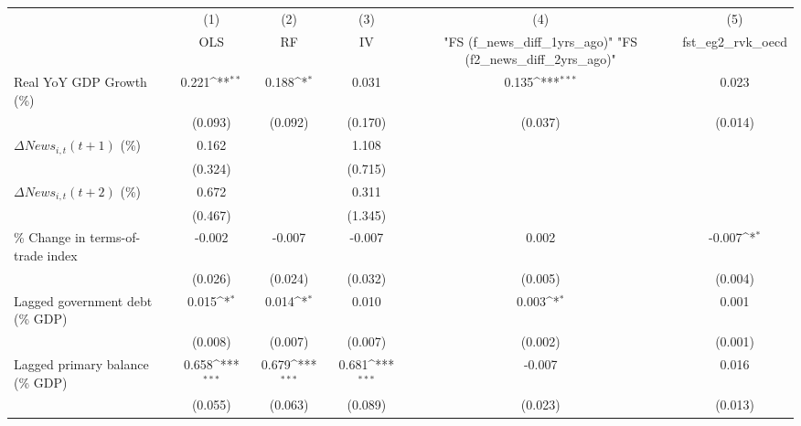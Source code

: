 {
\def\sym#1{\ifmmode^{#1}\else\(^{#1}\)\fi}
\begin{tabular}{l*{5}{c}}
\toprule
                    &\multicolumn{1}{c}{(1)}&\multicolumn{1}{c}{(2)}&\multicolumn{1}{c}{(3)}&\multicolumn{1}{c}{(4)}&\multicolumn{1}{c}{(5)}\\
                    &\multicolumn{1}{c}{OLS}&\multicolumn{1}{c}{RF}&\multicolumn{1}{c}{IV}&\multicolumn{1}{c}{ "FS (f_news_diff_1yrs_ago)"  "FS (f2_news_diff_2yrs_ago)" }&\multicolumn{1}{c}{fst_eg2_rvk_oecd}\\
\midrule
Real YoY GDP Growth (\%)&       0.221\sym{**} &       0.188\sym{*}  &       0.031         &       0.135\sym{***}&       0.023         \\
                    &     (0.093)         &     (0.092)         &     (0.170)         &     (0.037)         &     (0.014)         \\
\addlinespace
$ \Delta News_{i,t}(t+1)$ (\%)&       0.162         &                     &       1.108         &                     &                     \\
                    &     (0.324)         &                     &     (0.715)         &                     &                     \\
\addlinespace
$ \Delta News_{i,t}(t+2)$ (\%)&       0.672         &                     &       0.311         &                     &                     \\
                    &     (0.467)         &                     &     (1.345)         &                     &                     \\
\addlinespace
\% Change in terms-of-trade index&      -0.002         &      -0.007         &      -0.007         &       0.002         &      -0.007\sym{*}  \\
                    &     (0.026)         &     (0.024)         &     (0.032)         &     (0.005)         &     (0.004)         \\
\addlinespace
Lagged government debt (\% GDP)&       0.015\sym{*}  &       0.014\sym{*}  &       0.010         &       0.003\sym{*}  &       0.001         \\
                    &     (0.008)         &     (0.007)         &     (0.007)         &     (0.002)         &     (0.001)         \\
\addlinespace
Lagged primary balance (\% GDP)&       0.658\sym{***}&       0.679\sym{***}&       0.681\sym{***}&      -0.007         &       0.016         \\
                    &     (0.055)         &     (0.063)         &     (0.089)         &     (0.023)         &     (0.013)         \\

\end{tabular}}
